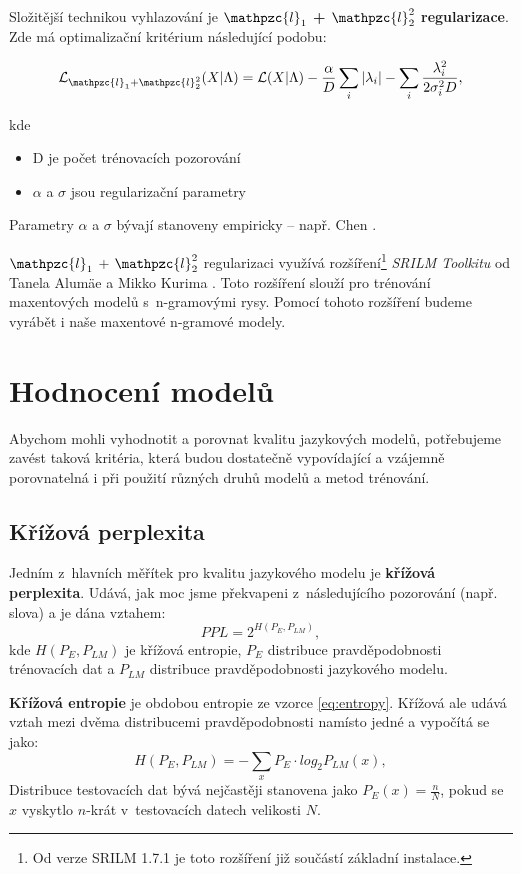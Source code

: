 \documentclass[12pt,a4paper]{report}
\begin{document}
Složitější technikou vyhlazování je \textbf{$\mathpzc{l}_1$ + $\mathpzc{l}_2^2$ regularizace}. Zde má optimalizační kritérium následující podobu:

\begin{equation}
\mathcal{L}_{\mathpzc{l}_1 + \mathpzc{l}_2^2} (X|\Lambda) = \mathcal{L}(X|\Lambda) - \frac{\alpha}{D} \sum_i |\lambda_i| - \sum_i \frac{\lambda_i^2}{2\sigma_i^2 D},
\end{equation}

\pagebreak

kde \begin{itemize}
\item{D je počet trénovacích pozorování}
\item{$\alpha$ a $\sigma$ jsou regularizační parametry}
\end{itemize}

Parametry $\alpha$ a $\sigma$ bývají stanoveny empiricky -- např. Chen \cite{chen2}.

$\mathpzc{l}_1$ + $\mathpzc{l}_2^2$ regularizaci využívá rozšíření\footnote{Od verze SRILM 1.7.1 je toto rozšíření již součástí základní instalace.} \textit{SRILM Toolkitu} od Tanela Alumäe a Mikko Kurima \cite{tanel}. Toto rozšíření slouží pro trénování maxentových modelů s~n-gramovými rysy. Pomocí tohoto rozšíření budeme vyrábět i naše maxentové n-gramové modely.

\section{Hodnocení modelů}
Abychom mohli vyhodnotit a porovnat kvalitu jazykových modelů, potřebujeme zavést taková kritéria, která budou dostatečně vypovídající a vzájemně porovnatelná i při použití různých druhů modelů a metod trénování.
\subsection{Křížová perplexita}
Jedním z~hlavních měřítek pro kvalitu jazykového modelu je \textbf{křížová perplexita}. Udává, jak moc jsme překvapeni z~následujícího pozorování (např. slova) a je dána vztahem:
\begin{equation}
PPL = 2^{H(P_E, P_{LM})},
\end{equation}
kde $H(P_E, P_{LM})$ je křížová entropie, $P_E$ distribuce pravděpodobnosti trénovacích dat a $P_{LM}$ distribuce pravděpodobnosti jazykového modelu.

\textbf{Křížová entropie} je obdobou entropie ze vzorce \eqref{eq:entropy}. Křížová ale udává vztah mezi dvěma distribucemi pravděpodobnosti namísto jedné a vypočítá se jako:
\begin{equation}
H(P_E, P_{LM}) = -\sum_x {P_E} \cdot log_2 P_{LM}(x),
\end{equation}
Distribuce testovacích dat bývá nejčastěji stanovena jako $P_E(x) = \frac{n}{N}$, pokud se $x$ vyskytlo $n$-krát v~testovacích datech velikosti $N$.
\end{document}
